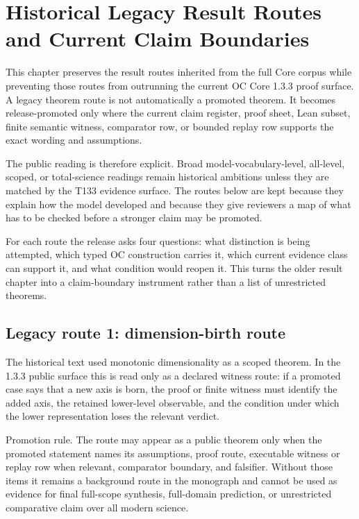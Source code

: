 
\section{Historical Legacy Result Routes and Current Claim Boundaries}

\label{sec:results}

This chapter preserves the result routes inherited from the full Core corpus while preventing those routes from outrunning the current OC Core 1.3.3 proof surface. A legacy theorem route is not automatically a promoted theorem. It becomes release-promoted only where the current claim register, proof sheet, Lean subset, finite semantic witness, comparator row, or bounded replay row supports the exact wording and assumptions.


The public reading is therefore explicit. Broad model-vocabulary-level, all-level, scoped, or total-science readings remain historical ambitions unless they are matched by the T133 evidence surface. The routes below are kept because they explain how the model developed and because they give reviewers a map of what has to be checked before a stronger claim may be promoted.


For each route the release asks four questions: what distinction is being attempted, which typed OC construction carries it, which current evidence class can support it, and what condition would reopen it. This turns the older result chapter into a claim-boundary instrument rather than a list of unrestricted theorems.


\subsection{Legacy route 1: dimension-birth route}

The historical text used monotonic dimensionality as a scoped theorem. In the 1.3.3 public surface this is read only as a declared witness route: if a promoted case says that a new axis is born, the proof or finite witness must identify the added axis, the retained lower-level observable, and the condition under which the lower representation loses the relevant verdict.


Promotion rule. The route may appear as a public theorem only when the promoted statement names its assumptions, proof route, executable witness or replay row when relevant, comparator boundary, and falsifier. Without those items it remains a background route in the monograph and cannot be used as evidence for final full-scope synthesis, full-domain prediction, or unrestricted comparative claim over all modern science.


